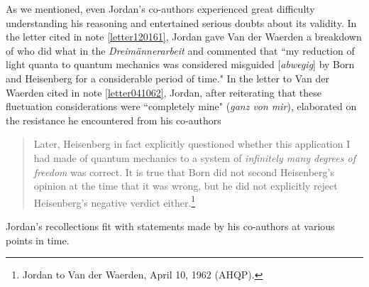 \documentclass[12pt]{elsart}
\begin{document}
As we mentioned, even Jordan's co-authors experienced great difficulty understanding his reasoning and entertained serious doubts about its validity. In the letter cited in note \ref{letter120161}, Jordan gave Van der Waerden a breakdown of who did what in the  {\it Dreim\"annerarbeit} and commented that ``my reduction of light quanta to quantum mechanics was considered misguided [{\it abwegig}] by Born and Heisenberg for a considerable period of time." In the letter to Van der Waerden cited in note \ref{letter041062}, Jordan, after  reiterating that these fluctuation considerations were ``completely mine" ({\it ganz von mir}),  elaborated on the resistance he encountered from his co-authors
\begin{quotation}
Later, Heisenberg in fact explicitly questioned whether this application I had made of quantum mechanics to a system of {\it infinitely many degrees of freedom} was correct. It is true that Born did not second Heisenberg's opinion at the time that it was wrong, but he did not explicitly reject Heisenberg's negative verdict either.\footnote{\label{letter041062a}Jordan to Van der Waerden, April 10, 1962 (AHQP).} 
\end{quotation}
Jordan's recollections fit with statements made by his co-authors at various points in time. 
\end{document}
